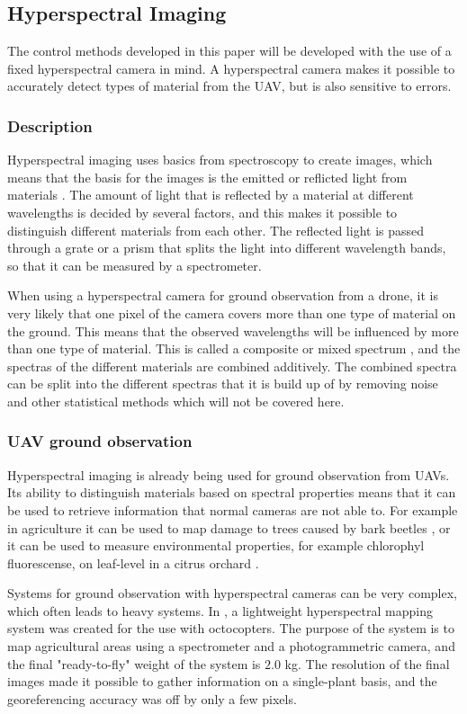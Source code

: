 \subsection{Hyperspectral Imaging}
The control methods developed in this paper will be developed with the use of a fixed hyperspectral camera in mind. A hyperspectral camera makes it possible to accurately detect types of material from the UAV, but is also sensitive to errors.


\subsubsection{Description}
Hyperspectral imaging uses basics from spectroscopy to create images, which means that the basis for the images is the emitted or reflicted light from materials \cite{hypSMITH}. The amount of light that is reflected by a material at different wavelengths is decided by several factors, and this makes it possible to distinguish different materials from each other. The reflected light is passed through a grate or a prism that splits the light into different wavelength bands, so that it can be measured by a spectrometer.

When using a hyperspectral camera for ground observation from a drone, it is very likely that one pixel of the camera covers more than one type of material on the ground. This means that the observed wavelengths will be influenced by more than one type of material. This is called a composite or mixed spectrum \cite{hypSMITH}, and the spectras of the different materials are combined additively. The combined spectra can be split into the different spectras that it is build up of by removing noise and other statistical methods which will not be covered here.


\subsubsection{UAV ground observation}
Hyperspectral imaging is already being used for ground observation from UAVs. Its ability to distinguish materials based on spectral properties means that it can be used to retrieve information that normal cameras are not able to. For example in agriculture it can be used to map damage to trees caused by bark beetles \cite{beetleNASI}, or it can be used to measure environmental properties, for example chlorophyl fluorescense, on leaf-level in a citrus orchard \cite{waterStressBERNI}.

Systems for ground observation with hyperspectral cameras can be very complex, which often leads to heavy systems. In \cite{hymsySUOMALAINEN}, a lightweight hyperspectral mapping system was created for the use with octocopters. The purpose of the system is to map agricultural areas using a spectrometer and a photogrammetric camera, and the final "ready-to-fly" weight of the system is $2.0$ kg. The resolution of the final images made it possible to gather information on a single-plant basis, and the georeferencing accuracy was off by only a few pixels.

